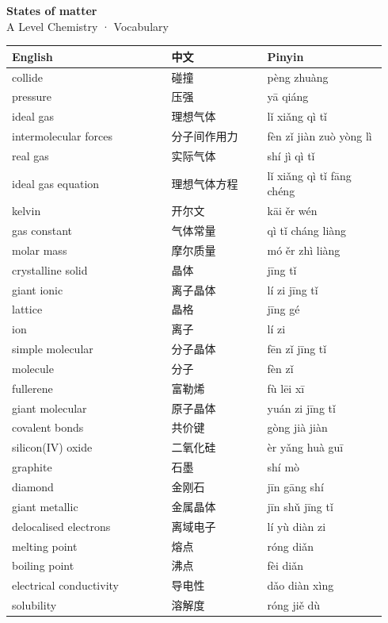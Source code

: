\documentclass[11pt]{article}
\begin{document}
\begin{center}
  {\LARGE\bfseries States of matter}\\[0.35em]
  {\large A Level Chemistry · Vocabulary}
\end{center}
\vspace{0.6em}

\begin{longtable}{@{}p{0.40\linewidth}p{0.24\linewidth}p{0.30\linewidth}@{}}
\toprule
\textbf{English} & \textbf{中文} & \textbf{Pinyin} \\
\midrule
\endhead
\bottomrule
\endlastfoot
collide & 碰撞 & pèng zhuàng \\
pressure & 压强 & yā qiáng \\
ideal gas & 理想气体 & lǐ xiǎng qì tǐ \\
intermolecular forces & 分子间作用力 & fèn zǐ jiàn zuò yòng lì \\
real gas & 实际气体 & shí jì qì tǐ \\
ideal gas equation & 理想气体方程 & lǐ xiǎng qì tǐ fāng chéng \\
kelvin & 开尔文 & kāi ěr wén \\
gas constant & 气体常量 & qì tǐ cháng liàng \\
molar mass & 摩尔质量 & mó ěr zhì liàng \\
crystalline solid & 晶体 & jīng tǐ \\
giant ionic & 离子晶体 & lí zi jīng tǐ \\
lattice & 晶格 & jīng gé \\
ion & 离子 & lí zi \\
simple molecular & 分子晶体 & fēn zǐ jīng tǐ \\
molecule & 分子 & fèn zǐ \\
fullerene & 富勒烯 & fù lēi xī \\
giant molecular & 原子晶体 & yuán zi jīng tǐ \\
covalent bonds & 共价键 & gòng jià jiàn \\
silicon(IV) oxide & 二氧化硅 & èr yǎng huà guī \\
graphite & 石墨 & shí mò \\
diamond & 金刚石 & jīn gāng shí \\
giant metallic & 金属晶体 & jīn shǔ jīng tǐ \\
delocalised electrons & 离域电子 & lí yù diàn zi \\
melting point & 熔点 & róng diǎn \\
boiling point & 沸点 & fèi diǎn \\
electrical conductivity & 导电性 & dǎo diàn xìng \\
solubility & 溶解度 & róng jiě dù \\
\end{longtable}
\end{document}

